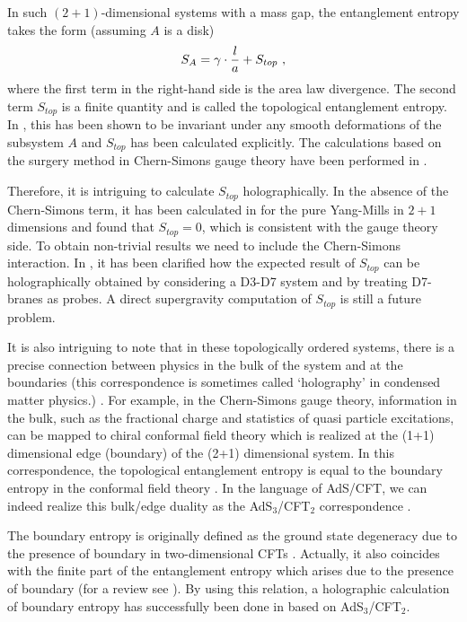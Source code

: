 \documentclass[12pt]{article}
\def\frac#1#2{{#1\over #2}}
\def\f {\frac}
\def\frac#1#2{{#1\over #2}}
\def\be{\begin{equation}}
\def\ee{\end{equation}}
\begin{document}
In such $(2+1)$-dimensional systems with a mass gap, the entanglement entropy takes the form (assuming $A$ is
a disk)
\be
S_A=\gamma\cdot\f{l}{a}+S_{top}\ ,
\ee
where the first term in the right-hand side is the area law divergence. The second term $S_{top}$ is a finite
quantity and is called the topological entanglement entropy.
In \cite{Levin05,Kitaev05}, this has been shown to be invariant under any smooth deformations of the subsystem $A$ and $S_{top}$
has been calculated explicitly.
The calculations based on the surgery method in Chern-Simons gauge theory \cite{WiCS}
have been performed in \cite{DFLN}.

Therefore, it is intriguing to calculate $S_{top}$ holographically. In the absence of
the Chern-Simons term,
it has been calculated in \cite{Pakman:2008ui} for the pure Yang-Mills in $2+1$
dimensions
and found that
$S_{top}=0$, which is consistent with the gauge theory side. To obtain non-trivial results we need to
include the Chern-Simons interaction. In \cite{Fujita:2009kw}, it has been clarified how the expected
result of $S_{top}$ can be holographically obtained by considering a D3-D7 system and by treating D7-branes
as probes. A direct supergravity computation of $S_{top}$ is still a future problem.

It is also intriguing to note that in these topologically ordered systems,
there is a precise connection between physics in the bulk of the system
and at the boundaries
(this correspondence is sometimes called `holography' in condensed matter physics.)
\cite{Fendley:2006gr}.
For example,
in the Chern-Simons gauge theory, information in the bulk,
such as the fractional charge and statistics of quasi particle excitations,
can be mapped to
chiral conformal field theory which is realized at
the (1+1) dimensional edge (boundary) of the (2+1) dimensional system.
In this correspondence, the topological entanglement entropy is
equal to the boundary entropy in the conformal field theory \cite{Fendley:2006gr}.
In the language of AdS/CFT, we can indeed realize this
bulk/edge duality as the AdS$_3$/CFT$_2$ correspondence \cite{Fujita:2009kw}.



The boundary entropy is originally defined as the ground state degeneracy due to the presence of
boundary in two-dimensional CFTs \cite{AfLu}. Actually, it also coincides with the finite part of
the entanglement entropy which arises due to the presence of boundary \cite{Cardy} (for a review see 
\cite{Afl}). By using this relation,
a holographic calculation of boundary entropy has successfully
been done in \cite{Azeyanagi:2007qj} based on AdS$_3$/CFT$_2$.
\end{document}
